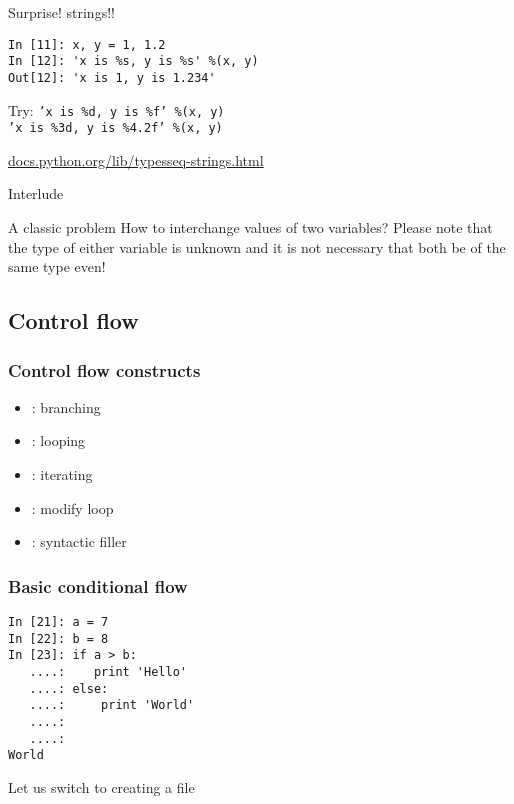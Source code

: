\documentclass[14pt,compress]{beamer}
\newcounter{time}
\newcommand{\inctime}[1]{\addtocounter{time}{#1}{\tiny \thetime\ m}}
\newcommand{\kwrd}[1]{ \texttt{\textbf{\color{blue}{#1}}}  }
\begin{document}
\begin{frame}[fragile]{Surprise! strings!!}
  \begin{lstlisting}
In [11]: x, y = 1, 1.2
In [12]: 'x is %s, y is %s' %(x, y)
Out[12]: 'x is 1, y is 1.234'
  \end{lstlisting}
  \begin{block}{Try:}
    \texttt{'x is \%d, y is \%f' \%(x, y) }\\
    \texttt{'x is \%3d, y is \%4.2f' \%(x, y) }
  \end{block}
  \small
\url{docs.python.org/lib/typesseq-strings.html}\\
\end{frame}

\begin{frame}
  {Interlude}
  \begin{block}
    {A classic problem}
    How to interchange values of two variables? Please note that the type of either variable is unknown and it is not necessary that both be of the same type even!
  \end{block}
  \inctime{30}
\end{frame}


\subsection{Control flow}
\begin{frame}
  \frametitle{Control flow constructs}  
  \begin{itemize}
  \item \kwrd{if/elif/else}: branching
  \item \kwrd{while}: looping
  \item \kwrd{for}: iterating 
  \item \kwrd{break, continue}: modify loop 
  \item \kwrd{pass}: syntactic filler
  \end{itemize}
\end{frame}

\begin{frame}[fragile]
  \frametitle{Basic conditional flow}
  \begin{lstlisting}
In [21]: a = 7
In [22]: b = 8
In [23]: if a > b:
   ....:    print 'Hello'
   ....: else:
   ....:     print 'World'
   ....:
   ....:
World
  \end{lstlisting}
  Let us switch to creating a file
\end{frame}
\end{document}
